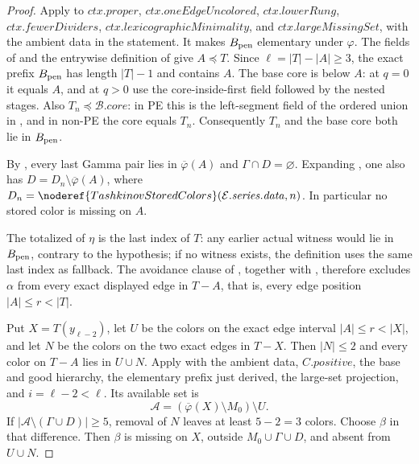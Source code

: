 \begin{proof}
Apply  to
$\mathit{ctx.proper}$, $\mathit{ctx.oneEdgeUncolored}$,
$\mathit{ctx.lowerRung}$, $\mathit{ctx.fewerDividers}$,
$\mathit{ctx.lexicographicMinimality}$, and
$\mathit{ctx.largeMissingSet}$, with the ambient data in the statement.
It makes $B_{\rm pen}$ elementary under $\varphi$.
The fields of  and the entrywise definition
of  give $A\preccurlyeq T$.
Since $\ell=|T|-|A|\ge3$, the exact prefix $B_{\rm pen}$ has length
$|T|-1$ and contains $A$. The base core is below $A$: at $q=0$
it equals $A$, and at $q>0$ use the core-inside-first field followed
by the nested stages. Also $T_n\preccurlyeq\mathcal B.\mathit{core}$:
in PE this is the left-segment field of the ordered union in
, and in non-PE the core equals $T_n$.
Consequently $T_n$ and the base core both lie in $B_{\rm pen}$.

By , every last Gamma pair lies
in $\overline\varphi(A)$ and $\Gamma\cap D=\varnothing$.
Expanding , one also has
$D=D_n\setminus\overline\varphi(A)$, where
$D_n=\noderef{TashkinovStoredColors}(\mathcal E.\mathit{series.data},n)$.
In particular no stored color is missing on $A$.

The totalized  of $\eta$ is the
last index of $T$: any earlier actual witness would lie in
$B_{\rm pen}$, contrary to the hypothesis; if no witness exists, the
definition uses the same last index as fallback. The avoidance clause
of , together with
, therefore excludes $\alpha$ from
every exact displayed edge in $T-A$, that is, every edge position
$|A|\le r<|T|$.

Put $X=T(y_{\ell-2})$, let $U$ be the colors on the exact edge interval
$|A|\le r<|X|$, and let $N$ be the colors on the two exact edges in
$T-X$. Then $|N|\le2$ and every color on $T-A$ lies in $U\cup N$.
Apply  with the ambient data, $C.\mathit{positive}$,
the base and good hierarchy, the elementary prefix just derived, the
large-set projection, and $i=\ell-2<\ell$. Its available set is
\[
 \mathcal A=(\overline\varphi(X)\setminus M_0)\setminus U .
\]
If $|\mathcal A\setminus(\Gamma\cup D)|\ge5$, removal of $N$ leaves
at least $5-2=3$ colors. Choose $\beta$ in that difference. Then
$\beta$ is missing on $X$, outside $M_0\cup\Gamma\cup D$, and absent
from $U\cup N$.


\end{proof}
